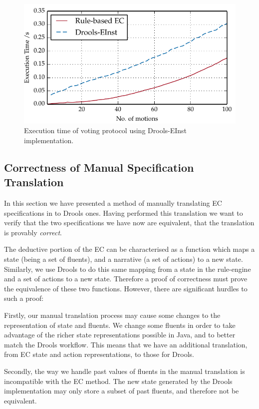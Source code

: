 \begin{figure}
\centering
\includegraphics{gfx/ec/droolsvsrules}
\caption{Execution time of voting protocol using Drools-EInst implementation.}\label{fig:droolsperf}
\end{figure}

\subsection{Correctness of Manual Specification Translation}

In this section we have presented a method of manually translating \ac{EC}
specifications in to Drools ones. Having performed this translation we want to
verify that the two specifications we have now are equivalent, that the
translation is provably \emph{correct}.

The deductive portion of the \ac{EC} can be characterised as a function which
maps a state (being a set of fluents), and a narrative (a set of actions) to a
new state. Similarly, we use Drools to do this same mapping from a state in
the rule-engine and a set of actions to a new state. Therefore a proof of
correctness must prove the equivalence of these two functions.
However, there are significant hurdles to such a proof:

Firstly, our manual translation process may cause some changes to the representation
of state and fluents. We change some fluents in order to take advantage of the
richer state representations possible in Java, and to better match the Drools
workflow. This means that we have an additional translation, from \ac{EC}
state and action representations, to those for Drools.

Secondly, the way we handle past values of fluents in the manual translation is
incompatible with the \ac{EC} method. The new state generated by the
Drools implementation may only store a subset of past fluents, and therefore
not be equivalent.

